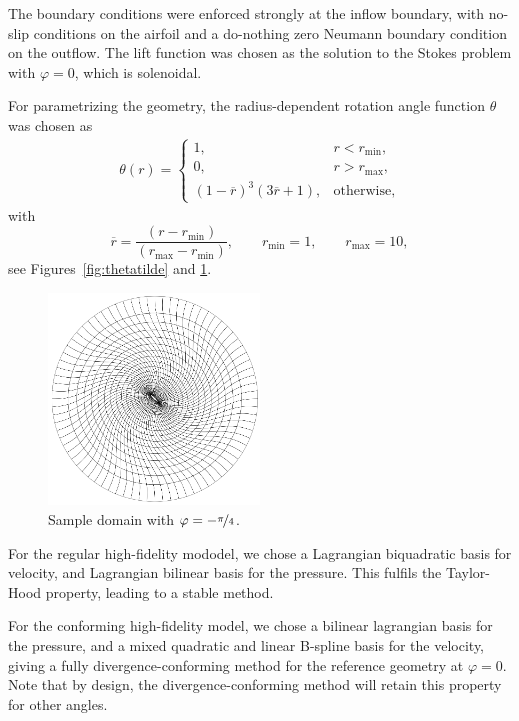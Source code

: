 \documentclass[onecolumn, twoside, a4paper, 11pt]{article}
\begin{document}
The boundary conditions were enforced strongly at the inflow boundary,
with no-slip conditions on the airfoil and a do-nothing zero Neumann
boundary condition on the outflow. The lift function was chosen as the
solution to the Stokes problem with $\varphi=0$, which is solenoidal.

For parametrizing the geometry, the radius-dependent rotation angle function
$\theta$ was chosen as
\begin{align}
  \theta(r) = \begin{cases}
    1, & r < r_\text{min}, \\
    0, & r > r_\text{max}, \\
    (1-\overline{r})^3 (3\overline{r}+1), & \text{otherwise},
  \end{cases}
\end{align}
with
\[
  \overline{r} = \frac{(r - r_\text{min})}{(r_\text{max} - r_\text{min})},
  \qquad r_\text{min} = 1, \qquad r_\text{max} = 10,
\]
see Figures~\ref{fig:thetatilde} and \ref{fig:domain}.

\begin{figure}
  \begin{center}
    \includegraphics[width=0.5\textwidth]{figs/domain}
  \end{center}
  \caption{Sample domain with $\varphi = -\nicefrac{\pi}{4}$.}
  \label{fig:domain}
\end{figure}

For the regular high-fidelity mododel, we chose a Lagrangian
biquadratic basis for velocity, and Lagrangian bilinear basis for the
pressure. This fulfils the Taylor-Hood property, leading to a stable
method.

For the conforming high-fidelity model, we chose a bilinear lagrangian
basis for the pressure, and a mixed quadratic and linear B-spline
basis for the velocity, giving a fully divergence-conforming method
for the reference geometry at $\varphi=0$. Note that by design, the
divergence-conforming method will retain this property for other
angles.
\end{document}
